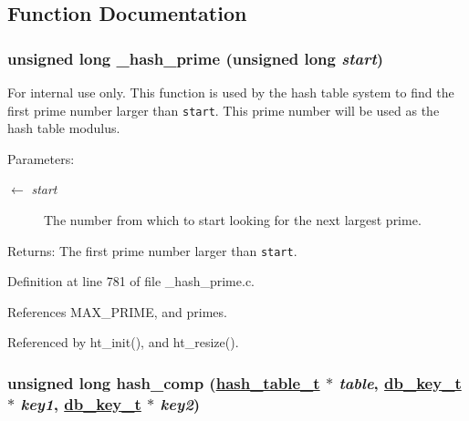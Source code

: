 \subsection{Function Documentation}
\hypertarget{group__dbprim__hash_ga20}{
\subsubsection[\_\-hash\_\-prime]{\setlength{\rightskip}{0pt plus 5cm}unsigned long \_\-hash\_\-prime (unsigned long {\em start})}}
\label{group__dbprim__hash_ga20}


\begin{Desc}
\item[For internal use only.]
This function is used by the hash table system to find the first prime number larger than {\tt start}. This prime number will be used as the hash table modulus.

\begin{Desc}
\item[Parameters:]
\begin{description}
\item[\mbox{$\leftarrow$} {\em start}]The number from which to start looking for the next largest prime.\end{description}
\end{Desc}
\begin{Desc}
\item[Returns:]The first prime number larger than {\tt start}.\end{Desc}
\end{Desc}


Definition at line 781 of file \_\-hash\_\-prime.c.

References MAX\_\-PRIME, and primes.

Referenced by ht\_\-init(), and ht\_\-resize().\hypertarget{group__dbprim__hash_ga9}{
\subsubsection[hash\_\-comp]{\setlength{\rightskip}{0pt plus 5cm}unsigned long hash\_\-comp (\hyperlink{struct__hash__table__s}{hash\_\-table\_\-t} $\ast$ {\em table}, \hyperlink{struct__db__key__s}{db\_\-key\_\-t} $\ast$ {\em key1}, \hyperlink{struct__db__key__s}{db\_\-key\_\-t} $\ast$ {\em key2})}}
\label{group__dbprim__hash_ga9}



